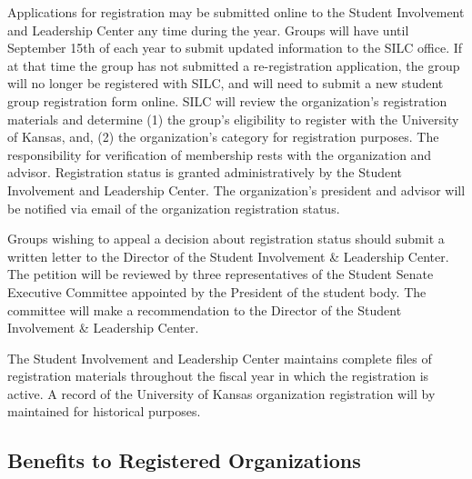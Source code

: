 Applications for registration may be submitted online to the Student Involvement
and Leadership Center any time during the year. Groups will have until September
15th of each year to submit updated information to the SILC office. If at that
time the group has not submitted a re-registration application, the group will
no longer be registered with SILC, and will need to submit a new student group
registration form online. SILC will review the organization's registration
materials and determine (1) the group's eligibility to register with the
University of Kansas, and, (2) the organization's category for registration
purposes. The responsibility for verification of membership rests with the
organization and advisor. Registration status is granted administratively by the
Student Involvement and Leadership Center. The organization's president and
advisor will be notified via email of the organization registration status.

Groups wishing to appeal a decision about registration status should submit a
written letter to the Director of the Student Involvement \& Leadership Center.
The petition will be reviewed by three representatives of the Student Senate
Executive Committee appointed by the President of the student body. The
committee will make a recommendation to the Director of the Student Involvement
\& Leadership Center.

The Student Involvement and Leadership Center maintains complete files of
registration materials throughout the fiscal year in which the registration
is active. A record of the University of Kansas organization registration will
by maintained for historical purposes.

\subsection{Benefits to Registered Organizations}

